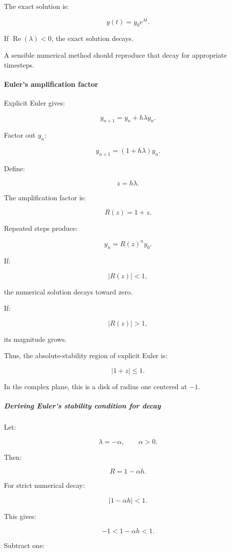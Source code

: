The exact solution is:

\[
y(t)=y_0e^{\lambda t}.
\]

If \(\operatorname{Re}(\lambda)<0\), the exact solution decays.

A sensible numerical method should reproduce that decay for appropriate timesteps.

\paragraph{Euler's amplification factor}\label{02-foundations-ii-ch025-eulers-amplification-factor}

Explicit Euler gives:

\[
y_{n+1}=y_n+h\lambda y_n.
\]

Factor out \(y_n\):

\[
\boxed{ y_{n+1}=(1+h\lambda)y_n }.
\]

Define:

\[
z=h\lambda.
\]

The amplification factor is:

\[
R(z)=1+z.
\]

Repeated steps produce:

\[
y_n=R(z)^ny_0.
\]

If:

\[
|R(z)|<1,
\]

the numerical solution decays toward zero.

If:

\[
|R(z)|>1,
\]

its magnitude grows.

Thus, the absolute-stability region of explicit Euler is:

\[
\boxed{|1+z|\le1}.
\]

In the complex plane, this is a disk of radius one centered at \(-1\).

\subparagraph{Deriving Euler's stability condition for decay}\label{02-foundations-ii-ch025-deriving-eulers-stability-condition-for-decay}

Let:

\[
\lambda=-\alpha,\qquad\alpha>0.
\]

Then:

\[
R=1-\alpha h.
\]

For strict numerical decay:

\[
|1-\alpha h|<1.
\]

This gives:

\[
-1<1-\alpha h<1.
\]

Subtract one:

